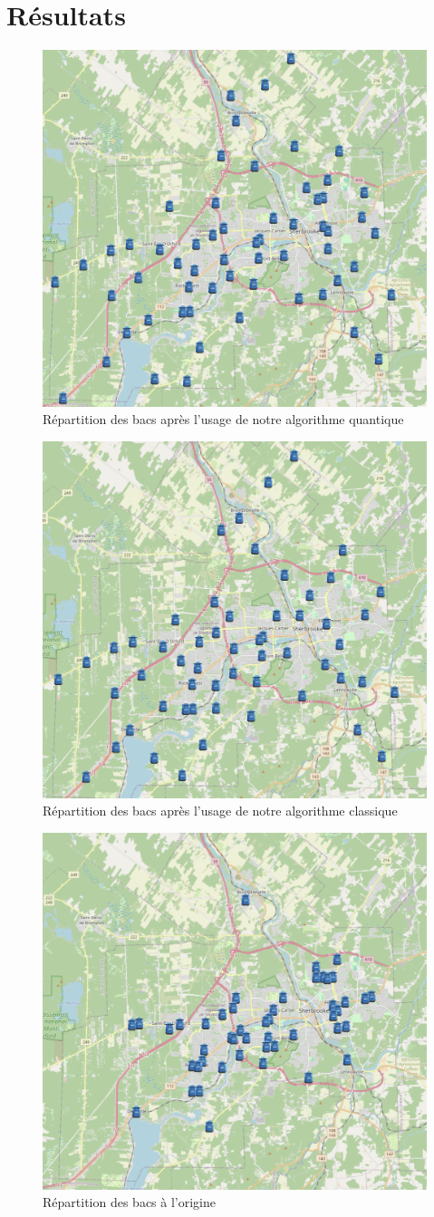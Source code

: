 \documentclass[11pt]{article}
\begin{document}
\section{Résultats}
\begin{figure}[H]
    \centering
    \includegraphics[width=0.49\linewidth]{images/new_quantum.png}
    \caption{Répartition des bacs après l'usage de notre algorithme quantique}
    \label{new_quantum}
\end{figure}
\begin{figure}[H]
    \centering
    \includegraphics[width=0.49\linewidth]{images/new_classical.png}
    \caption{Répartition des bacs après l'usage de notre algorithme classique}
    \label{new_classical}
\end{figure}
\begin{figure}[H]
    \centering
    \includegraphics[width=0.49\linewidth]{images/original.png}
    \caption{Répartition des bacs à l'origine}
    \label{original}
\end{figure}
\end{document}
